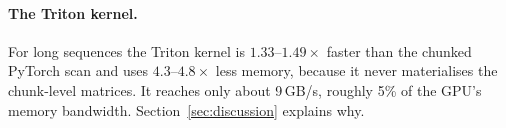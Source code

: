 \paragraph{The Triton kernel.} For long sequences the Triton kernel is $1.33$--$1.49\times$ faster than the
chunked PyTorch scan and uses $4.3$--$4.8\times$ less memory, because it never materialises the chunk-level
matrices. It reaches only about 9\,GB/s, roughly 5\% of the GPU's memory bandwidth. Section~\ref{sec:discussion}
explains why.
